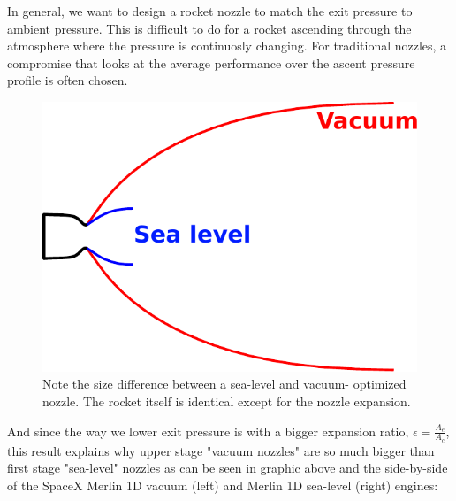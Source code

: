 \documentclass[twocolumn]{memoir} %
\begin{document}
In general, we want to design a rocket nozzle to match
the exit pressure to ambient pressure. This is difficult to do for a
rocket ascending through the atmosphere where the pressure is
continuosly changing. For traditional nozzles, a compromise that looks
at the average performance over the ascent pressure profile is often
chosen.

\begin{figure}[H]
    \includegraphics[width=0.9\columnwidth]{nozzle_sl_vacuum}
    \caption{Note the size difference between a sea-level and vacuum- optimized 
    nozzle.  The rocket itself is identical except for the nozzle expansion.}
\end{figure}

And since the way we lower exit pressure is with a bigger expansion
ratio, \(\epsilon = \frac{A_e}{A_c}\), this result explains why upper
stage "vacuum nozzles" are so much bigger than first stage "sea-level"
nozzles as can be seen in graphic above and the side-by-side of the
SpaceX Merlin 1D vacuum (left) and Merlin 1D sea-level (right) engines:
\end{document}
